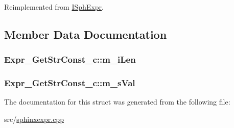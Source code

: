Reimplemented from \hyperlink{structISphExpr_a5e1268916a46b2b9cabb93d30ca5c40c}{I\-Sph\-Expr}.



\subsection{Member Data Documentation}
\hypertarget{structExpr__GetStrConst__c_a58b86293c30eff69861181af0d996d9a}{
\subsubsection[{m\-\_\-i\-Len}]{ Expr\-\_\-\-Get\-Str\-Const\-\_\-c\-::m\-\_\-i\-Len}}\label{structExpr__GetStrConst__c_a58b86293c30eff69861181af0d996d9a}
\hypertarget{structExpr__GetStrConst__c_a3cd5af6a80bcddb438087336c218714a}{
\subsubsection[{m\-\_\-s\-Val}]{ Expr\-\_\-\-Get\-Str\-Const\-\_\-c\-::m\-\_\-s\-Val}}\label{structExpr__GetStrConst__c_a3cd5af6a80bcddb438087336c218714a}


The documentation for this struct was generated from the following file\-:\begin{DoxyCompactItemize}
\item 
src/\hyperlink{sphinxexpr_8cpp}{sphinxexpr.\-cpp}\end{DoxyCompactItemize}
